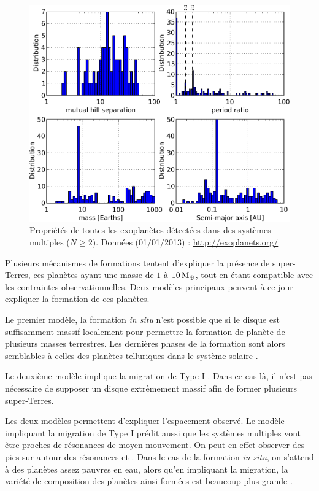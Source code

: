 \begin{figure}[htbp]
\centering
\includegraphics[width=0.8\linewidth]{figure/multiplanet_systems_stats.pdf}
\caption{Propriétés de toutes les exoplanètes détectées dans des systèmes multiples ($N\geqslant 2$). Données (01/01/2013) : \url{http://exoplanets.org/}}\label{fig:multiplanet_stats}
\end{figure}

\bigskip

Plusieurs mécanismes de formations tentent d'expliquer la présence de super-Terres, ces planètes ayant une masse de $1$ à $10\mathrm{\thinspace M_\oplus}$, tout en étant compatible avec les contraintes observationnelles. Deux modèles principaux peuvent à ce jour expliquer la formation de ces planètes. 

Le premier modèle, la \og formation \textit{in situ}\fg \citep{chiang2013minimum} n'est possible que si le disque est
suffisamment massif localement pour permettre la formation de planète de plusieurs masses terrestres. Les dernières phases de la
formation sont alors semblables à celles des planètes telluriques dans le système solaire \citep{wetherill1990formation,
kenyon2006terrestrial, morbidelli2012building}.

Le deuxième modèle implique la migration de Type I \citep{terquem2007migration}. Dans ce cas-là, il n'est pas nécessaire de supposer un disque extrêmement massif afin de former plusieurs super-Terres. 

Les deux modèles permettent d'expliquer l'espacement observé. Le modèle impliquant la migration de Type I prédit aussi que les
systèmes multiples vont être proches de résonances de moyen mouvement. On peut en effet observer des pics sur
 autour des résonances  et  \citep{rein2012period}. Dans le cas de la
formation \textit{in situ}, on s'attend à des planètes assez pauvres en eau, alors qu'en impliquant la migration, la variété de
composition des planètes ainsi formées est beaucoup plus grande \citep{raymond2008observable}.

